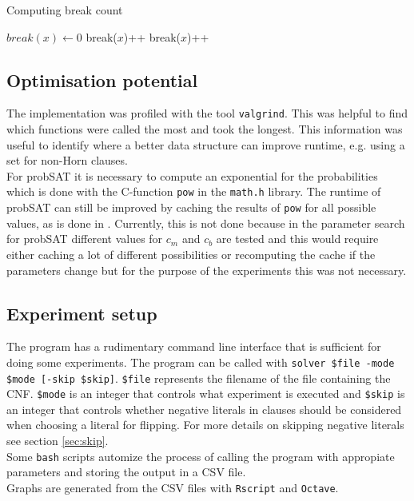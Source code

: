 \documentclass[12pt,a4paper]{article}
\begin{document}
\begin{algorithm}[ht]
  \caption{Computing break count}
  \label{alg:break_count}
  \begin{algorithmic}[1] 
    \State $break(x) \leftarrow 0$
            \State break($x$)++
           \EndIf
            \State {}
            \EndIf
      \EndFor
    \Else
            \State break($x$)++
          \EndIf
               \State {}
            \EndIf
        \EndFor
    \EndIf
    \State {}
    \EndProcedure
  \end{algorithmic}
\end{algorithm}
\subsection{Optimisation potential}
The implementation was profiled with the tool \texttt{valgrind}. This was helpful to find which functions were called the most and took the longest. This information was useful to identify where a better data structure can improve runtime, e.g. using a set for non-Horn clauses. \\
For probSAT it is necessary to compute an exponential for the probabilities which is done with the C-function \texttt{pow} in the \texttt{math.h} library. The runtime of probSAT can still be improved by caching the results of \texttt{pow} for all possible values, as is done in \cite{probsat_impl}. Currently, this is not done because in the parameter search for probSAT different values for $c_{m}$ and $c_{b}$ are tested and this would require either caching a lot of different possibilities or recomputing the cache if the parameters change but for the purpose of the experiments this was not necessary.
\subsection{Experiment setup}
The program has a rudimentary command line interface that is sufficient for doing some experiments. The program can be called with \texttt{solver \$file -mode \$mode [-skip \$skip]}. \texttt{\$file} represents the filename of the file containing the CNF. \texttt{\$mode} is an integer that controls what experiment is executed and \texttt{\$skip} is an integer that controls whether negative literals in clauses should be considered when choosing a literal for flipping. For more details on skipping negative literals see section \ref{sec:skip}.\\
Some \texttt{bash} scripts automize the process of calling the program with appropiate parameters and storing the output in a CSV file. \\
Graphs are generated from the CSV files with \texttt{Rscript} and \texttt{Octave}.
\end{document}
